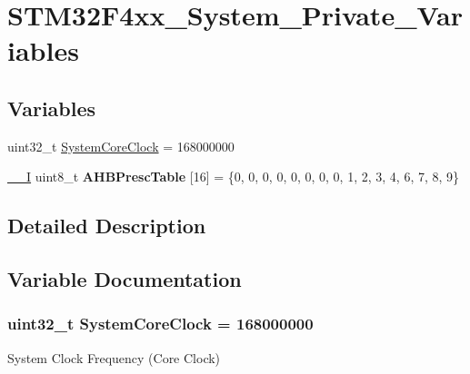 \hypertarget{group___s_t_m32_f4xx___system___private___variables}{\section{S\-T\-M32\-F4xx\-\_\-\-System\-\_\-\-Private\-\_\-\-Variables}
\label{group___s_t_m32_f4xx___system___private___variables}
}
\subsection*{Variables}
\begin{DoxyCompactItemize}
\item 
uint32\-\_\-t \hyperlink{group___s_t_m32_f4xx___system___private___variables_gaa3cd3e43291e81e795d642b79b6088e6}{System\-Core\-Clock} = 168000000
\item 
\hypertarget{group___s_t_m32_f4xx___system___private___variables_gacdc3ef54c0704c90e69a8a84fb2d970d}{\hyperlink{group___c_m_s_i_s__core__definitions_gaf63697ed9952cc71e1225efe205f6cd3}{\-\_\-\-\_\-\-I} uint8\-\_\-t {\bfseries A\-H\-B\-Presc\-Table} \mbox{[}16\mbox{]} = \{0, 0, 0, 0, 0, 0, 0, 0, 1, 2, 3, 4, 6, 7, 8, 9\}}\label{group___s_t_m32_f4xx___system___private___variables_gacdc3ef54c0704c90e69a8a84fb2d970d}

\end{DoxyCompactItemize}


\subsection{Detailed Description}


\subsection{Variable Documentation}
\hypertarget{group___s_t_m32_f4xx___system___private___variables_gaa3cd3e43291e81e795d642b79b6088e6}{
\subsubsection[{System\-Core\-Clock}]{\setlength{\rightskip}{0pt plus 5cm}uint32\-\_\-t System\-Core\-Clock = 168000000}}\label{group___s_t_m32_f4xx___system___private___variables_gaa3cd3e43291e81e795d642b79b6088e6}
System Clock Frequency (Core Clock) 